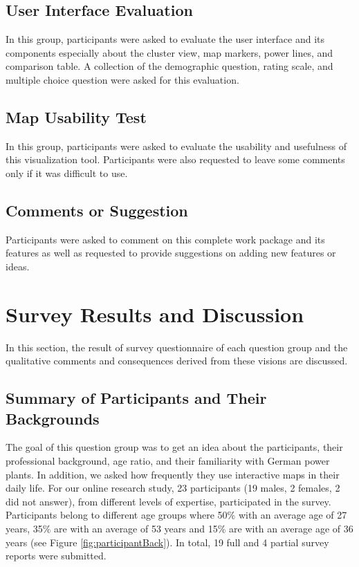 \subsection*{User Interface Evaluation}
\label{sssec:uiEval}

In this group, participants were asked to evaluate the user interface and its components especially about the cluster view, map markers, power lines, and comparison table. A collection of the demographic question, rating scale, and multiple choice question were asked for this evaluation. 

\subsection*{Map Usability Test}
\label{sssec:MUtest}

In this group, participants were asked to evaluate the usability and usefulness of this visualization tool. Participants were also requested to leave some comments only if it was difficult to use. 

\subsection*{Comments or Suggestion}
\label{sssec:cORS}

Participants were asked to comment on this complete work package and its features as well as requested to provide suggestions on adding new features or ideas.  

\section{Survey Results and Discussion}

In this section, the result of survey questionnaire of each question group and the qualitative comments and consequences derived from these visions are discussed. 

\subsection{Summary of Participants and Their Backgrounds}

The goal of this question group was to get an idea about the participants, their professional background, age ratio, and their familiarity with German power plants. In addition, we asked how frequently they use interactive maps in their daily life. For our online research study, 23 participants (19 males, 2 females, 2 did not answer), from different levels of expertise, participated in the survey. Participants belong to different age groups where 50\% with an average age of 27 years, 35\% are with an average of 53 years and 15\% are with an average age of 36 years (see Figure \ref{fig:participantBack}). In total, 19 full and 4 partial survey reports were submitted. 

